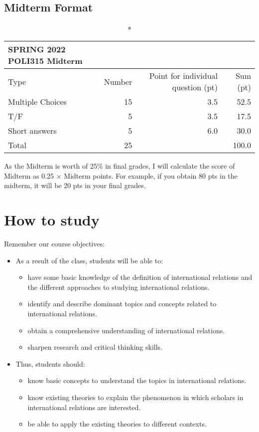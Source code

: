 \documentclass[
]{book}
\begin{document}
\hypertarget{midterm-format}{%
\subsection*{Midterm Format}\label{midterm-format}}

\captionsetup[table]{labelformat=empty,skip=1pt}
\begin{longtable}{lrrr}
\caption*{
{\large SPRING 2022 POLI315 Midterm}
} \\ 
\toprule
Type & Number & Point for individual question (pt) & Sum (pt) \\ 
\midrule
Multiple Choices & 15 & 3.5 & 52.5 \\ 
T/F & 5 & 3.5 & 17.5 \\ 
Short answers & 5 & 6.0 & 30.0 \\ 
Total & 25 &  & 100.0 \\ 
 \bottomrule
\end{longtable}

As the Midterm is worth of 25\% in final grades, I will calculate the score of Midterm as 0.25 \(\times\) Midterm points. For example, if you obtain 80 pts in the midterm, it will be 20 pts in your final grades.

\hypertarget{how-to-study}{%
\section*{How to study}\label{how-to-study}}

Remember our course objectives:

\begin{itemize}
\item
  As a result of the class, students will be able to:

  \begin{itemize}
  \item
    have some basic knowledge of the definition of international relations and the different approaches to studying international relations.
  \item
    identify and describe dominant topics and concepts related to international relations.
  \item
    obtain a comprehensive understanding of international relations.
  \item
    sharpen research and critical thinking skills.
  \end{itemize}
\item
  Thus, students should:

  \begin{itemize}
  \item
    know basic concepts to understand the topics in international relations.
  \item
    know existing theories to explain the phenomenon in which scholars in international relations are interested.
  \item
    be able to apply the existing theories to different contexts.
  \end{itemize}
\end{itemize}
\end{document}

